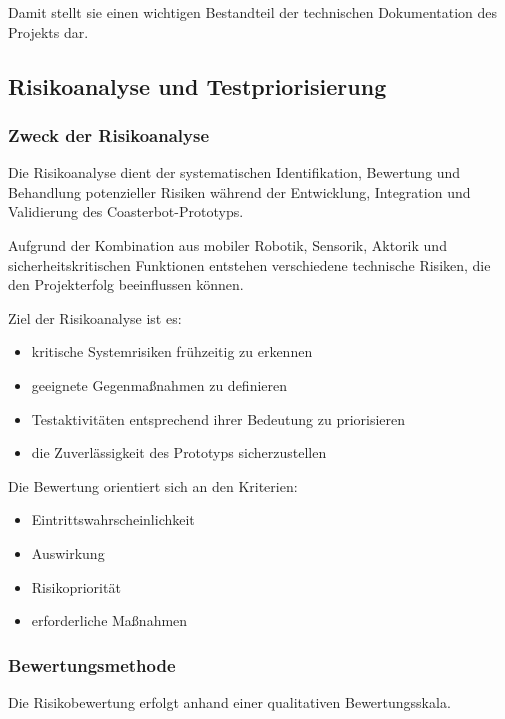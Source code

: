 Damit stellt sie einen wichtigen Bestandteil der technischen
Dokumentation des Projekts dar.

\subsection{Risikoanalyse und
Testpriorisierung}\label{risikoanalyse-und-testpriorisierung}

\subsubsection{Zweck der Risikoanalyse}\label{zweck-der-risikoanalyse}

Die Risikoanalyse dient der systematischen Identifikation, Bewertung und
Behandlung potenzieller Risiken während der Entwicklung, Integration und
Validierung des Coasterbot-Prototyps.

Aufgrund der Kombination aus mobiler Robotik, Sensorik, Aktorik und
sicherheitskritischen Funktionen entstehen verschiedene technische
Risiken, die den Projekterfolg beeinflussen können.

Ziel der Risikoanalyse ist es:

\begin{itemize}
\tightlist
\item
  kritische Systemrisiken frühzeitig zu erkennen
\item
  geeignete Gegenmaßnahmen zu definieren
\item
  Testaktivitäten entsprechend ihrer Bedeutung zu priorisieren
\item
  die Zuverlässigkeit des Prototyps sicherzustellen
\end{itemize}

Die Bewertung orientiert sich an den Kriterien:

\begin{itemize}
\tightlist
\item
  Eintrittswahrscheinlichkeit
\item
  Auswirkung
\item
  Risikopriorität
\item
  erforderliche Maßnahmen
\end{itemize}

\subsubsection{Bewertungsmethode}\label{bewertungsmethode}

Die Risikobewertung erfolgt anhand einer qualitativen Bewertungsskala.

